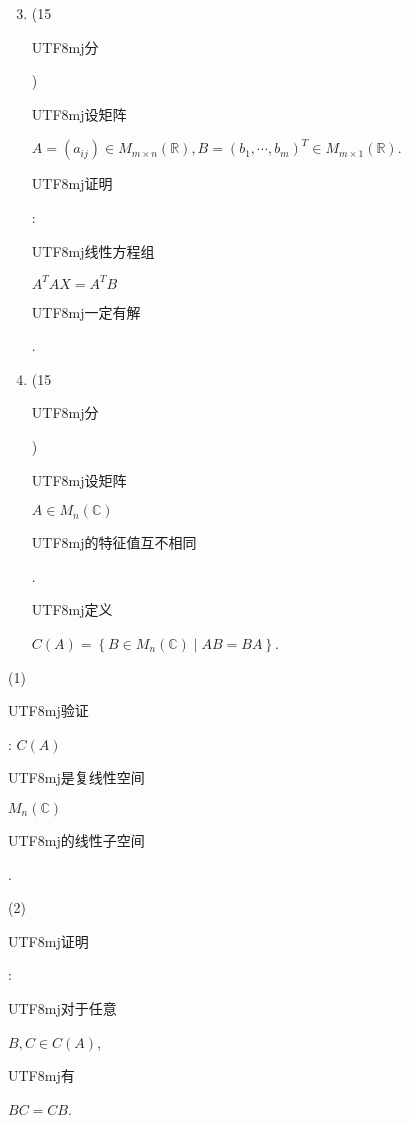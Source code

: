 \documentclass[10pt]{article}
\begin{document}
\begin{enumerate}
  \setcounter{enumi}{2}
  \item (15 \begin{CJK}{UTF8}{mj}分\end{CJK}) \begin{CJK}{UTF8}{mj}设矩阵\end{CJK} $A=\left(a_{i j}\right) \in M_{m \times n}(\mathbb{R}), B=\left(b_{1}, \cdots, b_{m}\right)^{T} \in M_{m \times 1}(\mathbb{R})$. \begin{CJK}{UTF8}{mj}证明\end{CJK}: \begin{CJK}{UTF8}{mj}线性方程组\end{CJK} $A^{T} A X=A^{T} B$ \begin{CJK}{UTF8}{mj}一定有解\end{CJK}.

  \item (15 \begin{CJK}{UTF8}{mj}分\end{CJK}) \begin{CJK}{UTF8}{mj}设矩阵\end{CJK} $A \in M_{n}(\mathbb{C})$ \begin{CJK}{UTF8}{mj}的特征值互不相同\end{CJK}. \begin{CJK}{UTF8}{mj}定义\end{CJK} $C(A)=\left\{B \in M_{n}(\mathbb{C}) \mid A B=B A\right\}$.

\end{enumerate}
(1) \begin{CJK}{UTF8}{mj}验证\end{CJK}: $C(A)$ \begin{CJK}{UTF8}{mj}是复线性空间\end{CJK} $M_{n}(\mathbb{C})$ \begin{CJK}{UTF8}{mj}的线性子空间\end{CJK}.

(2) \begin{CJK}{UTF8}{mj}证明\end{CJK}: \begin{CJK}{UTF8}{mj}对于任意\end{CJK} $B, C \in C(A)$, \begin{CJK}{UTF8}{mj}有\end{CJK} $B C=C B$.
\end{document}
